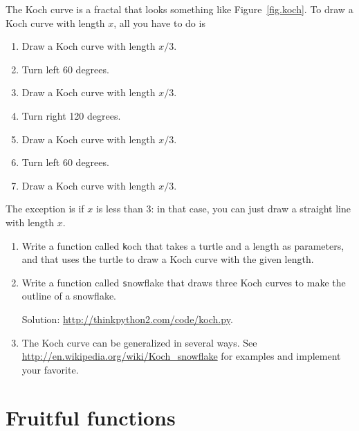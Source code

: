 \documentclass[
DIV=11,
fontsize=13,
twoside,
headinclude=false,
titlepage=firstiscover,
abstract=true,
headsepline=true,
footsepline=true,
chapterprefix=true, %
headings=big,
bibliography=totoc,%
captions=tableheading
]{scrbook}
\theoremstyle{definition}
\begin{document}
\begin{exercise}
\normalfont
{}

The Koch curve is a fractal that looks something like
Figure~\ref{fig.koch}.  To draw a Koch curve with length $x$, all you
have to do is

\begin{enumerate}

\item Draw a Koch curve with length $x/3$.

\item Turn left 60 degrees.

\item Draw a Koch curve with length $x/3$.

\item Turn right 120 degrees.

\item Draw a Koch curve with length $x/3$.

\item Turn left 60 degrees.

\item Draw a Koch curve with length $x/3$.

\end{enumerate}

The exception is if $x$ is less than 3: in that case,
you can just draw a straight line with length $x$.

\begin{enumerate}

\item Write a function called {\texttt koch} that takes a turtle and
a length as parameters, and that uses the turtle to draw a Koch
curve with the given length.

\item Write a function called {\texttt snowflake} that draws three
Koch curves to make the outline of a snowflake.

Solution: \url{http://thinkpython2.com/code/koch.py}.

\item The Koch curve can be generalized in several ways.  See
\url{http://en.wikipedia.org/wiki/Koch_snowflake} for examples and
implement your favorite.

\end{enumerate}
\end{exercise}


\chapter{Fruitful functions}
\label{fruitchap}
\end{document}
